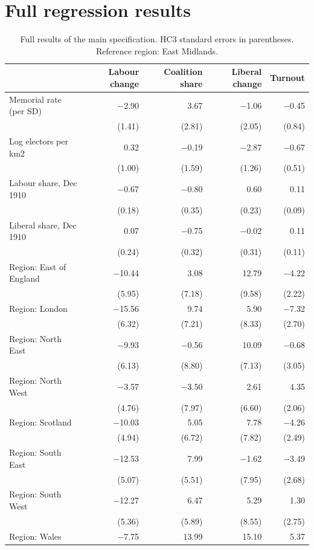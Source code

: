 \documentclass[11pt,a4paper]{article}
\begin{document}
\section{Full regression results}
\begin{table}[tbp]\centering\scriptsize\caption{Full results of the main specification. HC3 standard errors in parentheses. Reference region: East Midlands.}\label{tab:full}\begin{tabular}{lrrrr}\toprule & Labour change & Coalition share & Liberal change & Turnout\\\midrule
Memorial rate (per SD) & $-$2.90 & 3.67 & $-$1.06 & $-$0.45\\
 & (1.41) & (2.81) & (2.05) & (0.84)\\
Log electors per km2 & 0.32 & $-$0.19 & $-$2.87 & $-$0.67\\
 & (1.00) & (1.59) & (1.26) & (0.51)\\
Labour share, Dec 1910 & $-$0.67 & $-$0.80 & 0.60 & 0.11\\
 & (0.18) & (0.35) & (0.23) & (0.09)\\
Liberal share, Dec 1910 & 0.07 & $-$0.75 & $-$0.02 & 0.11\\
 & (0.24) & (0.32) & (0.31) & (0.11)\\
Region: East of England & $-$10.44 & 3.08 & 12.79 & $-$4.22\\
 & (5.95) & (7.18) & (9.58) & (2.22)\\
Region: London & $-$15.56 & 9.74 & 5.90 & $-$7.32\\
 & (6.32) & (7.21) & (8.33) & (2.70)\\
Region: North East & $-$9.93 & $-$0.56 & 10.09 & $-$0.68\\
 & (6.13) & (8.80) & (7.13) & (3.05)\\
Region: North West & $-$3.57 & $-$3.50 & 2.61 & 4.35\\
 & (4.76) & (7.97) & (6.60) & (2.06)\\
Region: Scotland & $-$10.03 & 5.05 & 7.78 & $-$4.26\\
 & (4.94) & (6.72) & (7.82) & (2.49)\\
Region: South East & $-$12.53 & 7.99 & $-$1.62 & $-$3.49\\
 & (5.07) & (5.51) & (7.95) & (2.68)\\
Region: South West & $-$12.27 & 6.47 & 5.29 & 1.30\\
 & (5.36) & (5.89) & (8.55) & (2.75)\\
Region: Wales & $-$7.75 & 13.99 & 15.10 & 5.37\\

\end{tabular}
\end{table}
\end{document}
